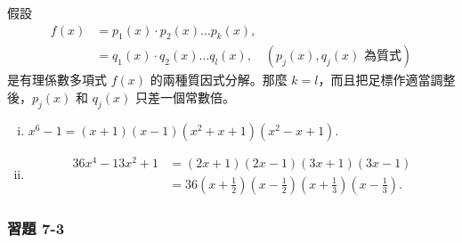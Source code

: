 \begin{theorem}[因子分解的唯一性]\label{thm:poly_unique_factorization}
假設
\begin{align*}
  f(x) &= p_1(x) \cdot p_2(x) \dots p_k(x), \\
  &= q_1(x) \cdot q_2(x) \dots q_l(x), \quad (p_j(x), q_j(x) \text{ 為質式})
\end{align*}
是有理係數多項式 $f(x)$ 的兩種質因式分解。那麼 $k=l$，而且把足標作適當調整後，$p_j(x)$ 和 $q_j(x)$ 只差一個常數倍。
\end{theorem}

\begin{example}\label{ex:7-1-10}
\begin{enumerate}[(i)]
  \item $x^6-1 = (x+1)(x-1)(x^2+x+1)(x^2-x+1)$.
  \item 
  \begin{align*}
    36x^4-13x^2+1 &= (2x+1)(2x-1)(3x+1)(3x-1) \\
    &= 36\left(x+\frac{1}{2}\right)\left(x-\frac{1}{2}\right)\left(x+\frac{1}{3}\right)\left(x-\frac{1}{3}\right).
  \end{align*}
\end{enumerate}
\end{example}

\subsubsection*{習題 7-3}\label{sec:ex7-3}

